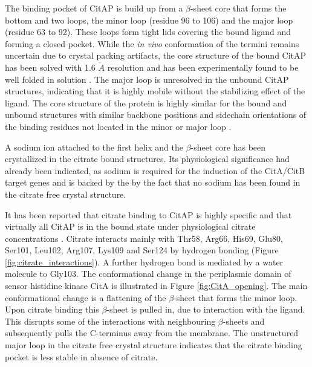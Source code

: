 \documentclass[english, a4paper, 12pt, titlepage, draft]{article}
\begin{document}
The binding pocket of CitAP is build up from a $\beta$-sheet core that forms the bottom and two loops, the minor loop (residue 96 to 106) and the major loop (residue 63 to 92).
These loops form tight lids covering the bound ligand and forming a closed pocket.
While the \textit{in vivo} conformation of the termini remains uncertain due to crystal packing artifacts, the core structure of the bound CitAP has been solved with 1.6 $\mathring{A}$ resolution and has been experimentally found to be well folded in solution \cite{CitA_2J80}.
The major loop is unresolved in the unbound CitAP structures, indicating that it is highly mobile without the stabilizing effect of the ligand.
The core structure of the protein is highly similar for the bound and unbound structures with similar backbone positions and sidechain orientations of the binding residues not located in the minor or major loop \cite{CitA_2J80}.

A sodium ion attached to the first helix and the $\beta$-sheet core has been crystallized in the citrate bound structures.
Its physiological significance had already been indicated, as sodium is required for the induction of the CitA/CitB target genes \cite{KlebsiellaMetabolism} and is backed by the by the fact that no sodium has been found in the citrate free crystal structure.

It has been reported that citrate binding to CitAP is highly specific and that virtually all CitAP is in the bound state under physiological citrate concentrations \cite{CitA_2J80}.
Citrate interacts mainly with Thr58, Arg66, His69, Glu80, Ser101, Leu102, Arg107, Lys109 and Ser124 by hydrogen bonding (Figure \ref{fig:citrate_interactions}).
A further hydrogen bond is mediated by a water molecule to Gly103.
The conformational change in the periplasmic domain of sensor histidine kinase CitA is illustrated in Figure \ref{fig:CitA_opening}.
The main conformational change is a flattening of the $\beta$-sheet that forms the minor loop.
Upon citrate binding this $\beta$-sheet is pulled in, due to interaction with the ligand.
This disrupts some of the interactions with neighbouring $\beta$-sheets and subsequently pulls the C-terminus away from the membrane.
The unstructured major loop in the citrate free crystal structure indicates that the citrate binding pocket is less stable in absence of citrate.
\end{document}
